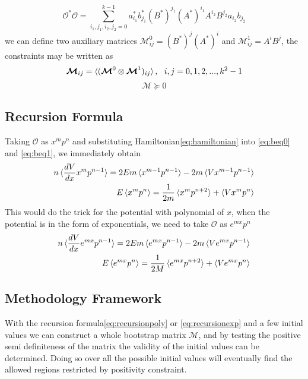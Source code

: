 \documentclass[aps, preprint,amsmath, amssymb]{revtex4-2}
\begin{document}
\begin{equation}
    \mathcal{O}^* \mathcal{O} = \sum_{i_1, j_1, i_2, j_2 = 0}^{k - 1} a_{i_1}^* b_{j_1}^* (B^*)^{j_1} (A^*)^{i_1} A^{i_2} B^{j_2} a_{i_2} b_{j_2}
\end{equation}
we can define two auxiliary matrices $\bm{\mathcal{M}}_{ij}^0 = (B^*)^j (A^*)^i$ and $\bm{\mathcal{M}}_{ij}^1 = A^i B^j$, the constraints may be written as
\begin{equation}
    \bm{\mathcal{M}}_{ij} = \braket{(\bm{\mathcal{M}}^0 \otimes \bm{\mathcal{M}}^1)_{ij}}, \ \ i, j = 0, 1, 2, ..., k^2 - 1
\end{equation}
\begin{equation}
    \bm{\mathcal{M}} \succeq 0
\end{equation}

\subsection{Recursion Formula}
Taking $\mathcal{O}$ as $x^m p^n$ and substituting Hamiltonian\eqref{eq:hamiltonian} into \eqref{eq:beq0} and \eqref{eq:beq1}, we immediately obtain
\begin{align}
    n \braket{\frac{d V}{d x} x^m p^{n - 1}} = 2E m \braket{x^{m - 1} p^{n - 1}} - 2m\braket{V x^{m - 1} p^{n - 1}} \notag \\
    E\braket{x^m p^n} = \frac1{2m}\braket{x^m p^{n + 2}} + \braket{V x^m p^n} \label{eq:recursionpoly}
\end{align}
This would do the trick for the potential with polynomial of $x$, when the potential is in the form of exponentials, we need to take $\mathcal{O}$ as $e^{mx} p^n$
\begin{align}
    n \braket{\frac{d V}{d x} e^{m x} p^{n - 1}} = 2Em\braket{e^{mx} p^{n - 1}} - 2m\braket{V e^{mx} p^{n - 1}}\notag \\
    E \braket{e^{mx} p^n} = \frac1{2M}\braket{e^{mx} p^{n + 2}} + \braket{Ve^{mx} p^n} \label{eq:recursionexp}
\end{align}

\subsection{Methodology Framework}
With the recursion formula\eqref{eq:recursionpoly} or \eqref{eq:recursionexp} and a few initial values we can construct a whole bootstrap matrix $\bm{\mathcal{M}}$, and by testing the positive semi definiteness of the matrix the validity of the initial values can be determined. Doing so over all the possible initial values will eventually find the allowed regions restricted by positivity constraint.
\end{document}
